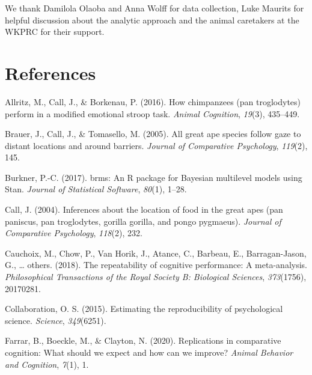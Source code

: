 \documentclass[10pt, letterpaper]{article}
\begin{document}
We thank Damilola Olaoba and Anna Wolff for data collection, Luke
Maurits for helpful discussion about the analytic approach and the
animal caretakers at the WKPRC for their support.

\hypertarget{references}{%
\section{References}\label{references}}

\setlength{\parindent}{-0.1in} 
\setlength{\leftskip}{0.125in}

\noindent

\hypertarget{refs}{}

\leavevmode\hypertarget{ref-allritz2016chimpanzees}{}%
Allritz, M., Call, J., \& Borkenau, P. (2016). How chimpanzees (pan
troglodytes) perform in a modified emotional stroop task. \emph{Animal
Cognition}, \emph{19}(3), 435--449.

\leavevmode\hypertarget{ref-brauer2005all}{}%
Brauer, J., Call, J., \& Tomasello, M. (2005). All great ape species
follow gaze to distant locations and around barriers. \emph{Journal of
Comparative Psychology}, \emph{119}(2), 145.

\leavevmode\hypertarget{ref-R-brms_a}{}%
Burkner, P.-C. (2017). {brms}: An {R} package for {Bayesian} multilevel
models using {Stan}. \emph{Journal of Statistical Software},
\emph{80}(1), 1--28.

\leavevmode\hypertarget{ref-call2004inferences}{}%
Call, J. (2004). Inferences about the location of food in the great apes
(pan paniscus, pan troglodytes, gorilla gorilla, and pongo pygmaeus).
\emph{Journal of Comparative Psychology}, \emph{118}(2), 232.

\leavevmode\hypertarget{ref-cauchoix2018repeatability}{}%
Cauchoix, M., Chow, P., Van Horik, J., Atance, C., Barbeau, E.,
Barragan-Jason, G., \ldots{} others. (2018). The repeatability of
cognitive performance: A meta-analysis. \emph{Philosophical Transactions
of the Royal Society B: Biological Sciences}, \emph{373}(1756),
20170281.

\leavevmode\hypertarget{ref-open2015estimating}{}%
Collaboration, O. S. (2015). Estimating the reproducibility of
psychological science. \emph{Science}, \emph{349}(6251).

\leavevmode\hypertarget{ref-farrar2020replicomp}{}%
Farrar, B., Boeckle, M., \& Clayton, N. (2020). Replications in
comparative cognition: What should we expect and how can we improve?
\emph{Animal Behavior and Cognition}, \emph{7}(1), 1.
\end{document}
